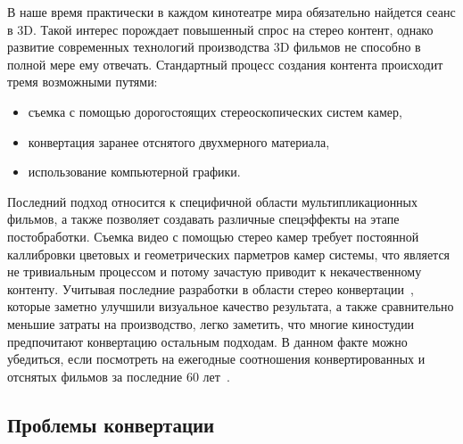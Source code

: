 \documentclass[12pt, a4paper]{article}
\begin{document}
В наше время практически в каждом кинотеатре мира обязательно найдется сеанс в 3D. 
Такой интерес порождает повышенный спрос на стерео контент, однако развитие 
современных технологий производства 3D фильмов не способно в полной мере ему отвечать. 
Стандартный процесс создания контента происходит тремя возможными путями: 
\begin{itemize}
	\item съемка с помощью дорогостоящих стереоскопических систем камер,
	\item конвертация заранее отснятого двухмерного материала,
	\item использование компьютерной графики.
\end{itemize}
Последний подход относится к специфичной области мультипликационных фильмов, 
а также позволяет создавать различные спецэффекты на этапе постобработки. 
Съемка видео с помощью стерео камер требует постоянной каллибровки цветовых и 
геометрических парметров камер системы, что является не тривиальным процессом и 
потому зачастую приводит к некачественному контенту.  Учитывая последние разработки 
в области стерео конвертации~\cite{ndjiki2011depth,tolstaya2015depth}, которые 
заметно улучшили визуальное качество результата, а также сравнительно меньшие 
затраты на производство, легко заметить, что многие киностудии предпочитают 
конвертацию остальным подходам. В данном факте можно убедиться, если посмотреть 
на ежегодные соотношения конвертированных и отснятых фильмов за последние 60 лет~\cite{realorfake}.

\subsection{Проблемы конвертации} 
\end{document}
